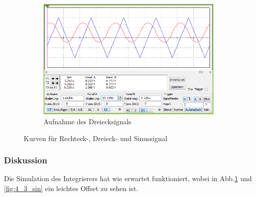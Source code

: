 \documentclass[12pt,a4paper]{article}
\begin{document}
\begin{figure}[H]
        \hfill
        \begin{subfigure}[t]{0.28\textwidth}
                \includegraphics[width=\textwidth , scale = 0.4]{4_4_drei.PNG}
                \caption[Aufnahme des Dreiecksignals]{Aufnahme des Dreiecksignals}
  				\label{fig:4_4_drei}
        \end{subfigure}
        \caption{Kurven  für Rechteck-, Dreieck- und Sinussignal}
        \label{fig:4_4}
\end{figure}

\subsubsection{Diskussion}

Die Simulation des Integrierers hat wie erwartet funktioniert, wobei in Abb.\ref{fig:4_4_drei} und \ref{fig:4_3_sin} ein leichtes Offset zu sehen ist.
\end{document}
